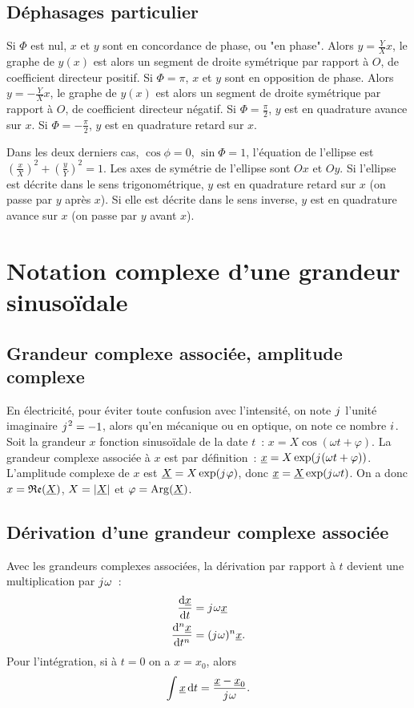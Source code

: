 \subsection{Déphasages particulier}
Si \(\Phi\) est nul, \(x\) et \(y\) sont en concordance de phase, 
ou "en phase". Alors \(y=\frac{Y}{X} x\), le graphe de \(y(x)\) est 
alors un segment de droite symétrique par rapport à \(O\), de 
coefficient directeur positif. Si \(\Phi=\pi\), \(x\) et \(y\) sont 
en opposition de phase. Alors \(y=-\frac{Y}{X} x\), le graphe de 
\(y(x)\) est alors un segment de droite symétrique par rapport à 
\(O\), de coefficient directeur négatif. Si \(\Phi=\frac{\pi}{2}\), 
\(y\) est en quadrature avance sur \(x\). Si 
\(\Phi=-\frac{\pi}{2}\), \(y\) est en quadrature retard sur \(x\).

Dans les deux derniers cas, \(\cos\phi = 0\), \(\sin\Phi=1\), 
l'équation de l'ellipse est \(\left(\frac{x}{X}\right)^2 + 
\left(\frac{y}{Y}\right)^2 = 1\). Les axes de symétrie de l'ellipse 
sont \(Ox\) et \(Oy\). Si l'ellipse est décrite dans le sens 
trigonométrique, \(y\) est en quadrature retard sur \(x\) (on passe 
par \(y\) après \(x\)). Si elle est décrite dans le sens inverse, 
\(y\) est en quadrature avance sur \(x\) (on passe par \(y\) avant 
\(x\)).
\section{Notation complexe d'une grandeur sinusoïdale}%
\label{sec:complexe}
\subsection{Grandeur complexe associée, amplitude complexe}
En électricité, pour éviter toute confusion avec l'intensité, on note 
\({j\mkern1mu}\) l'unité imaginaire \({j\mkern1mu}^2=-1\), alors qu'en mécanique ou en 
optique, on note ce nombre \({i\mkern1mu}\). Soit la grandeur \(x\) fonction 
sinusoïdale de la date \(t\)~: \(x = X\cos(\omega t +\varphi)\). La 
grandeur complexe associée à \(x\) est par définition~: \(\underline{x} = 
X\exp({j\mkern1mu}(\omega t +\varphi))\). L'amplitude complexe de \(x\) est 
\(\underline{X} = X\exp({j\mkern1mu} \varphi)\), donc \(\underline{x} = \underline{X} \exp({j\mkern1mu}\omega t)\). On 
a donc \(x = \mathfrak{Re}(\underline{X})\), \(X = \left\lvert\underline{X}\right\rvert\) et \(\varphi = \operatorname{Arg}(\underline{X})\).
\subsection{Dérivation d'une grandeur complexe associée}
Avec les grandeurs complexes associées, la dérivation par rapport à 
\(t\) devient une multiplication par \({j\mkern1mu}\omega\)~:
\begin{align}
  \dfrac{\mathrm{d} \underline{x}}{\mathrm{d} t} &= {j\mkern1mu}\omega\underline{x} \\
  \dfrac{\mathrm{d}^{n} \underline{x}}{\mathrm{d} {t}^{n}} &= ({j\mkern1mu}\omega)^n\underline{x}.
\end{align}
Pour l'intégration, si à \(t=0\) on a \(x=x_0\), alors
\begin{equation}
  \int \underline{x} \mathop{}\mathopen{}\mathrm{d} t = \frac{\underline{x}-\underline{x}_0}{{j\mkern1mu}\omega}.
\end{equation}

